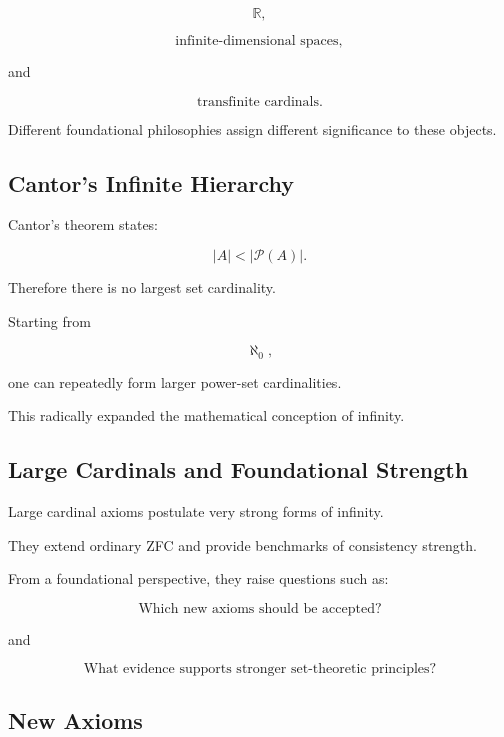 \[
\boxed{
\mathbb{R},
}
\]

\[
\boxed{
\text{infinite-dimensional spaces},
}
\]

and

\[
\boxed{
\text{transfinite cardinals}.
}
\]

Different foundational philosophies assign different significance to these
objects.

\subsection{Cantor's Infinite Hierarchy}
\label{subsec:cantor-infinite-hierarchy}

Cantor's theorem states:

\[
\boxed{
|A|
<
|\mathcal{P}(A)|.
}
\]

Therefore there is no largest set cardinality.

Starting from

\[
\aleph_0,
\]

one can repeatedly form larger power-set cardinalities.

This radically expanded the mathematical conception of infinity.

\subsection{Large Cardinals and Foundational Strength}
\label{subsec:large-cardinals-foundations}

Large cardinal axioms postulate very strong forms of infinity.

They extend ordinary ZFC and provide benchmarks of consistency strength.

From a foundational perspective, they raise questions such as:

\[
\boxed{
\text{Which new axioms should be accepted?}
}
\]

and

\[
\boxed{
\text{What evidence supports stronger set-theoretic principles?}
}
\]

\subsection{New Axioms}
\label{subsec:new-axioms-foundations}

